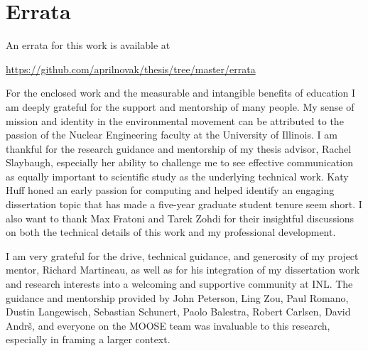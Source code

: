 \documentclass{ucbthesis}
\begin{document}
\begin{frontmatter}


\clearpage
\begin{KeepFromToc}
\tableofcontents
\end{KeepFromToc}
\clearpage

\clearpage
\printglossary[style=mystyle]

\clearpage


\clearpage


\clearpage
\chapter*{Errata}

An errata for this work is available at

\begin{center}
\url{https://github.com/aprilnovak/thesis/tree/master/errata}
\end{center}


\begin{acknowledgements}
For the enclosed work and the measurable and intangible benefits of education I am deeply grateful for the support and mentorship of many people. My sense of mission and identity in the environmental movement can be attributed to the passion of the Nuclear Engineering faculty at the University of Illinois. I am thankful for the research guidance and mentorship of my thesis advisor, Rachel Slaybaugh, especially her ability to challenge me to see effective communication as equally important to scientific study as the underlying technical work. Katy Huff honed an early passion for computing and helped identify an engaging dissertation topic that has made a five-year graduate student tenure seem short. I also want to thank Max Fratoni and Tarek Zohdi for their insightful discussions on both the technical details of this work and my professional development.

I am very grateful for the drive, technical guidance, and generosity of my project mentor, Richard Martineau, as well as for his integration of my dissertation work and research interests into a welcoming and supportive community at INL. The guidance and mentorship provided by John Peterson, Ling Zou, Paul Romano, Dustin Langewisch, Sebastian Schunert, Paolo Balestra, Robert Carlsen, David Andr\v{s}, and everyone on the MOOSE team was invaluable to this research, especially in framing a larger context.


\end{acknowledgements}
\end{frontmatter}
\end{document}
